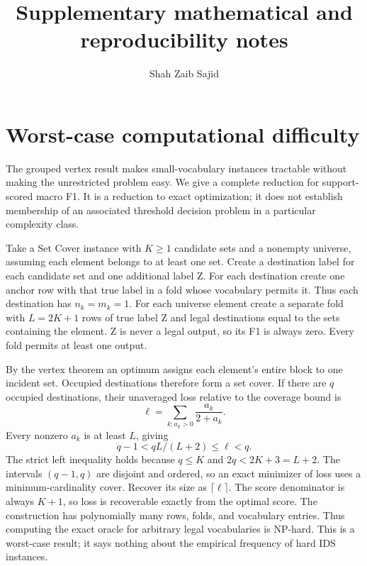 \documentclass[onecolumn]{svjour3}
\begin{document}
\title{Supplementary mathematical and reproducibility notes}\author{Shah Zaib Sajid}\date{}\maketitle
\section{Worst-case computational difficulty}
The grouped vertex result makes small-vocabulary instances tractable without making the unrestricted problem easy. We give a complete reduction for support-scored macro F1. It is a reduction to exact optimization; it does not establish membership of an associated threshold decision problem in a particular complexity class.

Take a Set Cover instance with $K\ge 1$ candidate sets and a nonempty universe, assuming each element belongs to at least one set. Create a destination label for each candidate set and one additional label Z. For each destination create one anchor row with that true label in a fold whose vocabulary permits it. Thus each destination has $n_k=m_k=1$. For each universe element create a separate fold with $L=2K+1$ rows of true label Z and legal destinations equal to the sets containing the element. Z is never a legal output, so its F1 is always zero. Every fold permits at least one output.

By the vertex theorem an optimum assigns each element's entire block to one incident set. Occupied destinations therefore form a set cover. If there are $q$ occupied destinations, their unaveraged loss relative to the coverage bound is
\begin{equation}\ell=\sum_{k:a_k>0}\frac{a_k}{2+a_k}.\end{equation}
Every nonzero $a_k$ is at least $L$, giving
\begin{equation}q-1 < q L/(L+2) \le  \ell < q.\end{equation}
The strict left inequality holds because $q\le K$ and $2q<2K+3=L+2$. The intervals $(q-1,q)$ are disjoint and ordered, so an exact minimizer of loss uses a minimum-cardinality cover. Recover its size as $\lceil \ell\rceil$. The score denominator is always $K+1$, so loss is recoverable exactly from the optimal score. The construction has polynomially many rows, folds, and vocabulary entries. Thus computing the exact oracle for arbitrary legal vocabularies is NP-hard. This is a worst-case result; it says nothing about the empirical frequency of hard IDS instances.
\end{document}
